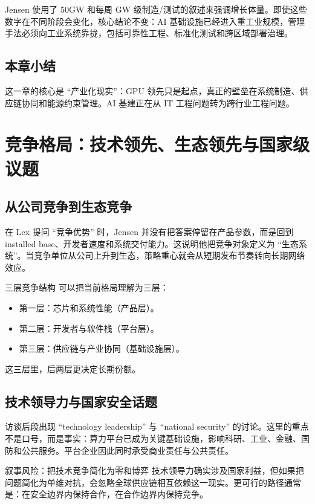 \documentclass[a4paper]{article}
\begin{document}
Jensen 使用了 50GW 和每周 GW 级制造/测试的叙述来强调增长体量。即使这些数字在不同阶段会变化，核心结论不变：AI 基础设施已经进入重工业规模，管理手法必须向工业系统靠拢，包括可靠性工程、标准化测试和跨区域部署治理。

\subsection{本章小结}

这一章的核心是 ``产业化现实''：GPU 领先只是起点，真正的壁垒在系统制造、供应链协同和能源约束管理。AI 基建正在从 IT 工程问题转为跨行业工程问题。

\section{竞争格局：技术领先、生态领先与国家级议题}

\subsection{从公司竞争到生态竞争}

在 Lex 提问 ``竞争优势'' 时，Jensen 并没有把答案停留在产品参数，而是回到 installed base、开发者速度和系统交付能力。这说明他把竞争对象定义为 ``生态系统''。当竞争单位从公司上升到生态，策略重心就会从短期发布节奏转向长期网络效应。

\begin{knowledgebox}{三层竞争结构}
可以把当前格局理解为三层：
\begin{itemize}
    \item 第一层：芯片和系统性能（产品层）。
    \item 第二层：开发者与软件栈（平台层）。
    \item 第三层：供应链与产业协同（基础设施层）。
\end{itemize}
这三层里，后两层更决定长期份额。
\end{knowledgebox}

\subsection{技术领导力与国家安全话题}

访谈后段出现 ``technology leadership'' 与 ``national security'' 的讨论。这里的重点不是口号，而是事实：算力平台已成为关键基础设施，影响科研、工业、金融、国防和公共服务。平台企业因此同时承受商业责任与公共责任。

\begin{warningbox}{叙事风险：把技术竞争简化为零和博弈}
技术领导力确实涉及国家利益，但如果把问题简化为单维对抗，会忽略全球供应链相互依赖这一现实。更可行的路径通常是：在安全边界内保持合作，在合作边界内保持竞争。
\end{warningbox}
\end{document}
